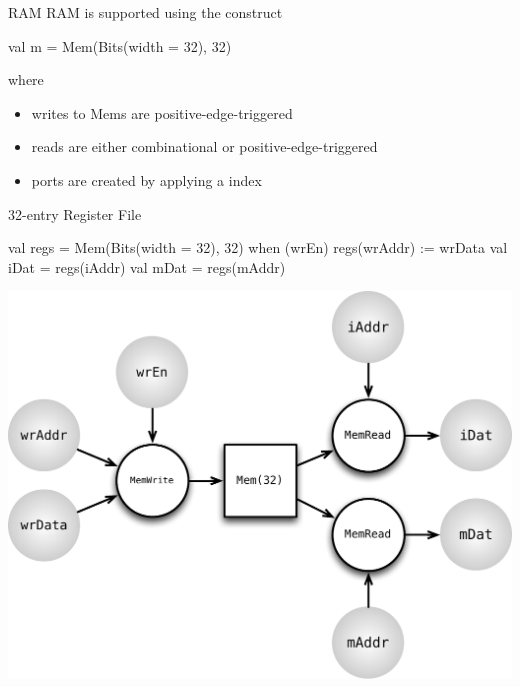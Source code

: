 \documentclass[xcolor=pdflatex,dvipsnames,table]{beamer}
\begin{document}
\begin{frame}[fragile]{RAM}
RAM is supported using the  construct

\begin{scala}
val m = Mem(Bits(width = 32), 32)
\end{scala}

\noindent
where
\begin{itemize}
\item writes to Mems are positive-edge-triggered
\item reads are either combinational or positive-edge-triggered
\item ports are created by applying a  index
\end{itemize}
\end{frame}

\begin{frame}[fragile]{32-entry Register File}

\begin{scala}
val regs = Mem(Bits(width = 32), 32)
when (wrEn) {
  regs(wrAddr) := wrData
}
val iDat = regs(iAddr)
val mDat = regs(mAddr)
\end{scala}

\begin{center}
\includegraphics[height=0.55\textheight]{figs/mem.pdf} 
\end{center}

\end{frame}
\end{document}
